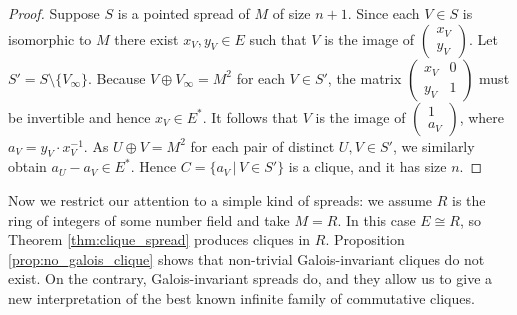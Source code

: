 \documentclass{amsart}
\theoremstyle{plain}
\theoremstyle{definition}
\newcommand{\clq}{C}
\newcommand{\nrg}{R}
\begin{document}
\begin{proof}
	Suppose \(S\) is a pointed spread of \(M\) of size \(n+1\).
	Since each \(V\in S\) is isomorphic to \(M\) there exist \(x_V,y_V\in E\) such that \(V\) is the image of \(\left(\begin{smallmatrix}x_V \\ y_V\end{smallmatrix}\right)\).
	Let \(S'=S\setminus\{V_\infty\}\).
	Because \(V\oplus V_\infty = M^2\) for each \(V\in S'\), the matrix \(\left( \begin{smallmatrix} x_V & 0 \\ y_V & 1 \end{smallmatrix} \right)\) must be invertible and hence \(x_V\in E^*\).
	It follows that \(V\) is the image of \(\left( \begin{smallmatrix} 1 \\ a_V \end{smallmatrix} \right)\), where \(a_V=y_V \cdot x_V^{-1}\).
	As \(U\oplus V = M^2\) for each pair of distinct \(U,V\in S'\), we similarly obtain \(a_U-a_V\in E^*\).
	Hence \(\clq=\{a_V\,|\, V\in S'\}\) is a clique, and it has size \(n\).
\end{proof}

Now we restrict our attention to a simple kind of spreads: we assume $\nrg$ is the ring of integers of some number field and take $M=\nrg$. In this case $E\cong\nrg$, so Theorem \ref{thm:clique_spread} produces cliques in $\nrg$. Proposition \ref{prop:no_galois_clique} shows that non-trivial Galois-invariant cliques do not exist. On the contrary, Galois-invariant spreads do, and they allow us to give a new interpretation of the best known infinite family of commutative cliques.
\end{document}
